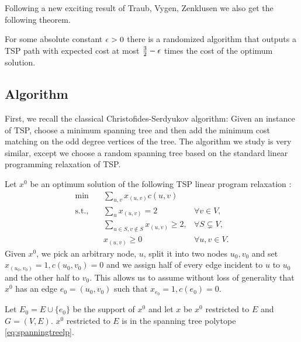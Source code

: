 Following a new exciting result of Traub, Vygen, Zenklusen \cite{TVZ20} we also get the following theorem.
\begin{theorem}
	For some absolute constant ${\epsilon}>0$ there is a randomized algorithm that outputs a TSP path with expected cost at most $\frac{3}{2}-{\epsilon}$ times the cost of the optimum solution.
\end{theorem}


\subsection{Algorithm}
First, we recall the classical Christofides-Serdyukov algorithm: Given an instance of TSP, choose a minimum spanning tree and then add the minimum cost matching on the odd degree vertices of the tree. The algorithm we study is very similar, except we choose a random spanning tree based on the standard linear programming relaxation of TSP. 

Let $x^0$ be an optimum   solution of the following TSP   linear program relaxation \cite{DFJ59,HK70}:
\begin{equation}\label{eq:tsplp}
\begin{aligned}
	\min \quad& \sum_{u,v} x_{(u,v)} c(u,v)& \\
	\text{s.t.,} \quad &  \sum_{u} x_{(u,v)} = 2&\forall v\in V,\\
	& \sum_{u\in S, v\notin S} x_{(u,v)}\geq 2,&\forall S\subsetneq V,\\
	& x_{(u,v)}\geq 0 &\forall u,v\in V.
\end{aligned}\tag{Held-Karp relaxation}	
\end{equation}
Given  $x^0$, we pick an arbitrary node, $u$, split it into two nodes $u_0,v_0$ and set $x_{(u_0,v_0)}=1, c(u_0,v_0)=0$ and we assign half of every edge incident to $u$ to $u_0$ and the other half to $v_0$.  This allows us to assume without loss of generality that $x^0$ has an edge $e_0=(u_0,v_0)$  such that  $x_{e_0}=1, c(e_0)=0$. 

Let $E_0=E\cup\{e_0\}$ be the support of $x^0$ and let $x$ be $x^0$ restricted to $E$ and $G=(V,E)$.
$x^0$ restricted to $E$ is in the spanning tree polytope \eqref{eq:spanningtreelp}.

